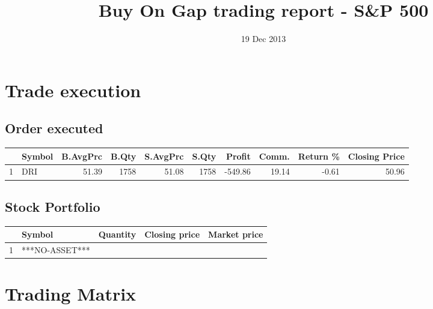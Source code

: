 \documentclass{tufte-handout}\usepackage[]{graphicx}\usepackage[]{color}
\title{Buy On Gap trading report - S\&P 500}
\date{ 19 Dec 2013 }
\begin{document}
\maketitle


\section{Trade execution}
\subsection{Order executed}

\begin{table}[ht]
\centering
\begin{tabular}{llrrrrrrr|r}
  \hline
 & Symbol & B.AvgPrc & B.Qty & S.AvgPrc & S.Qty & Profit & Comm. & Return \% & Closing Price \\ 
  \hline
1 & DRI & 51.39 & 1758 & 51.08 & 1758 & -549.86 & 19.14 & -0.61 & 50.96 \\ 
   \hline
\end{tabular}
\end{table}



\subsection{Stock Portfolio}
\begin{table}[ht]
\centering
\begin{tabular}{llrrr}
  \hline
 & Symbol & Quantity & Closing price & Market price \\ 
  \hline
1 & ***NO-ASSET*** &  &  &  \\ 
   \hline
\end{tabular}
\end{table}



\section{Trading Matrix}
\end{document}
